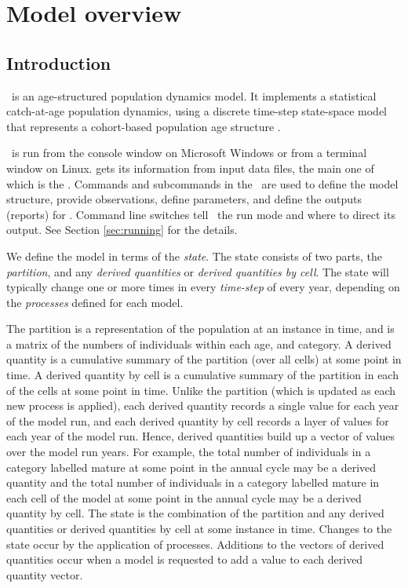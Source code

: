 \section{Model overview\label{sec:overview}}

\subsection{Introduction}
\CH

\CNAME\ is an age-structured population dynamics model. It implements a statistical catch-at-age population dynamics, using a discrete time-step state-space model that represents a cohort-based population age structure . 

\CNAME\ is run from the console window on Microsoft Windows or from a terminal window on Linux. \CNAME gets its information from input data files, the main one of which is the \emph{\config}. Commands and subcommands in the \config\ are used to define the model structure, provide observations, define parameters, and define the outputs (reports) for \CNAME. Command line switches tell \CNAME\ the run mode and where to direct its output. See Section \ref{sec:running} for the details.

 We define the model in terms of the \emph{state}. The state consists of two parts, the \emph{partition}, and any \emph{derived quantities} or \emph{derived quantities by cell}. The state will typically change one or more times in every \emph{time-step} of every year, depending on the \emph{processes} defined for each model. 

The partition is a representation of the population at an instance in time, and is a matrix of the numbers of individuals within each age, and category. A derived quantity is a cumulative summary of the partition (over all cells) at some point in time. A derived quantity by cell is a cumulative summary of the partition in each of the cells at some point in time. Unlike the partition (which is updated as each new process is applied), each derived quantity records a single value for each year of the model run, and each derived quantity by cell records a layer of values for each year of the model run. Hence, derived quantities build up a vector of values over the model run years. For example, the total number of individuals in a category labelled mature at some point in the annual cycle may be a derived quantity and the total number of individuals in a category labelled mature in each cell of the model at some point in the annual cycle may be a derived quantity by cell. The state is the combination of the partition and any derived quantities or derived quantities by cell at some instance in time. Changes to the state occur by the application of processes. Additions to the vectors of derived quantities occur when a model is requested to add a value to each derived quantity vector. 

